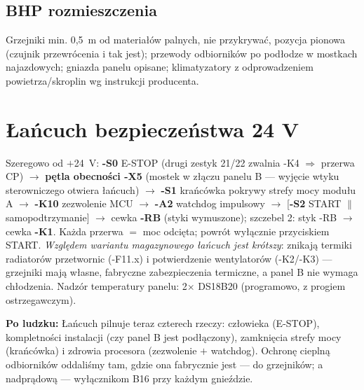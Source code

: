 \documentclass[11pt,a4paper]{article}
\newcommand{\why}[1]{\par\smallskip\noindent\colorbox{blue!6}{\parbox{0.965\linewidth}{\small\textbf{Po ludzku:} #1}}\par\smallskip}
\begin{document}
\subsection{BHP rozmieszczenia}
Grzejniki min. 0,5~m od materiałów palnych, nie przykrywać, pozycja pionowa (czujnik przewrócenia
i tak jest); przewody odbiorników po podłodze w mostkach najazdowych; gniazda panelu opisane;
klimatyzatory z odprowadzeniem powietrza/skroplin wg instrukcji producenta.

\section{Łańcuch bezpieczeństwa 24 V}
\label{sec:lancuch}
Szeregowo od $+$24~V: \textbf{-S0} E-STOP (drugi zestyk 21/22 zwalnia -K4 $\Rightarrow$ przerwa CP)
$\to$ \textbf{pętla obecności -X5} (mostek w złączu panelu B --- wyjęcie wtyku sterowniczego
otwiera łańcuch) $\to$ \textbf{-S1} krańcówka pokrywy strefy mocy modułu A $\to$ \textbf{-K10}
zezwolenie MCU $\to$ \textbf{-A2} watchdog impulsowy $\to$ [\textbf{-S2} START $\parallel$
samopodtrzymanie] $\to$ cewka \textbf{-RB} (styki wymuszone); szczebel 2: styk -RB $\to$ cewka
\textbf{-K1}. Każda przerwa $=$ moc odcięta; powrót wyłącznie przyciskiem START.
\emph{Względem wariantu magazynowego łańcuch jest krótszy}: znikają termiki radiatorów
przetwornic (-F11.x) i potwierdzenie wentylatorów (-K2/-K3) --- grzejniki mają własne, fabryczne
zabezpieczenia termiczne, a panel B nie wymaga chłodzenia. Nadzór temperatury panelu: 2$\times$
DS18B20 (programowo, z progiem ostrzegawczym).
\why{Łańcuch pilnuje teraz czterech rzeczy: człowieka (E-STOP), kompletności instalacji (czy
panel B jest podłączony), zamknięcia strefy mocy (krańcówka) i zdrowia procesora (zezwolenie
$+$ watchdog). Ochronę cieplną odbiorników oddaliśmy tam, gdzie ona fabrycznie jest --- do
grzejników; a nadprądową --- wyłącznikom B16 przy każdym gnieździe.}
\end{document}
